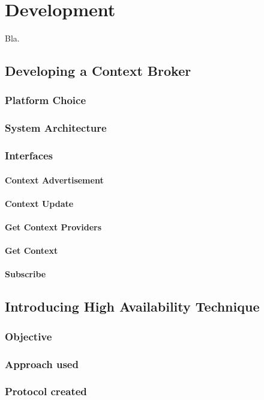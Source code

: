 \chapter{Development}
Bla.

\section{Developing a Context Broker}
 
\subsection{Platform Choice}

\subsection{System Architecture}

\subsection{Interfaces}

\subsubsection{Context Advertisement}

\subsubsection{Context Update}

\subsubsection{Get Context Providers}

\subsubsection{Get Context}

\subsubsection{Subscribe}

\section{Introducing High Availability Technique}

\subsection{Objective}

\subsection{Approach used}

\subsection{Protocol created}